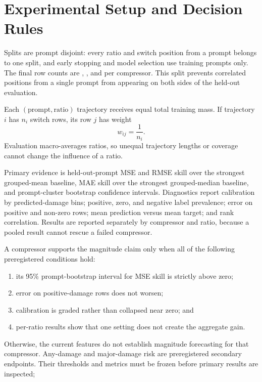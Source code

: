 \section{Experimental Setup and Decision Rules}

Splits are prompt disjoint: every ratio and switch position from a prompt
belongs to one split, and early stopping and model selection use training
prompts only. The final row counts are ,
, and  per compressor. This split
prevents correlated positions from a single prompt from appearing on both
sides of the held-out evaluation.

Each $(\text{prompt}, \text{ratio})$ trajectory receives equal total training
mass. If trajectory $i$ has $n_i$ switch rows, its row $j$ has weight
\begin{equation}
w_{ij}=\frac{1}{n_i}.
\end{equation}
Evaluation macro-averages ratios, so unequal trajectory lengths or coverage
cannot change the influence of a ratio.

Primary evidence is held-out-prompt MSE and RMSE skill over the strongest
grouped-mean baseline, MAE skill over the strongest grouped-median baseline,
and prompt-cluster bootstrap confidence intervals. Diagnostics report
calibration by predicted-damage bins; positive, zero, and negative label
prevalence; error on positive and non-zero rows; mean prediction versus mean
target; and rank correlation. Results are reported separately by compressor
and ratio, because a pooled result cannot rescue a failed compressor.

A compressor supports the magnitude claim only when all of the following
preregistered conditions hold:
\begin{enumerate}
  \item its 95\% prompt-bootstrap interval for MSE skill is strictly above
  zero;
  \item error on positive-damage rows does not worsen;
  \item calibration is graded rather than collapsed near zero; and
  \item per-ratio results show that one setting does not create the aggregate
  gain.
\end{enumerate}
Otherwise, the current features do not establish magnitude forecasting for
that compressor. Any-damage and major-damage risk are preregistered secondary
endpoints. Their thresholds and metrics must be frozen before primary results
are inspected; 
